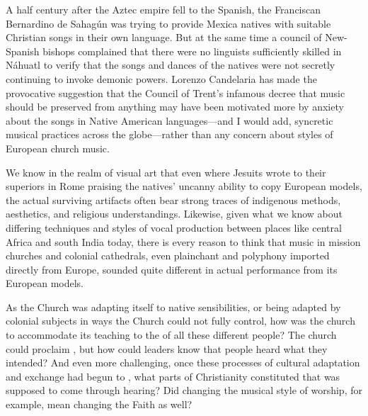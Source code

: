 A half century after the Aztec empire fell to the Spanish, the Franciscan Bernardino de Sahagún was trying to provide Mexica natives with suitable Christian songs in their own language.%
    \Autocite{Candelaria:Psalmodia}
But at the same time a council of New-Spanish bishops complained that there were no linguists sufficiently skilled in Náhuatl to verify that the songs and dances of the natives were not secretly continuing to invoke demonic powers.%
Lorenzo Candelaria has made the provocative suggestion that the Council of Trent's infamous decree that music should be preserved from anything  may have been motivated more by anxiety about the songs in Native American languages---and I would add, syncretic musical practices across the globe---rather than any concern about styles of European church music.%
    \Autocites[\XXX]{Candelaria:Psalmodia} %

We know in the realm of visual art that even where Jesuits wrote to their superiors in Rome praising the natives' uncanny ability to copy European models, the actual surviving artifacts often bear strong traces of indigenous methods, aesthetics, and religious understandings.%
    \Autocites[\XXX]{Bailey:Art}
Likewise, given what we know about differing techniques and styles of vocal production between places like central Africa and south India today, there is every reason to think that music in mission churches and colonial cathedrals, even plainchant and polyphony imported directly from Europe, sounded quite different in actual performance from its European models.

As the Church was adapting itself to native sensibilities, or being adapted by colonial subjects in ways the Church could not fully control, how was the church to accommodate its teaching to the  of all these different people?
The church could proclaim , but how could leaders know that people heard what they intended?
And even more challenging, once these processes of cultural adaptation and exchange had begun to , what parts of Christianity constituted  that was supposed to come through hearing?
Did changing the musical style of worship, for example, mean changing the Faith as well?

